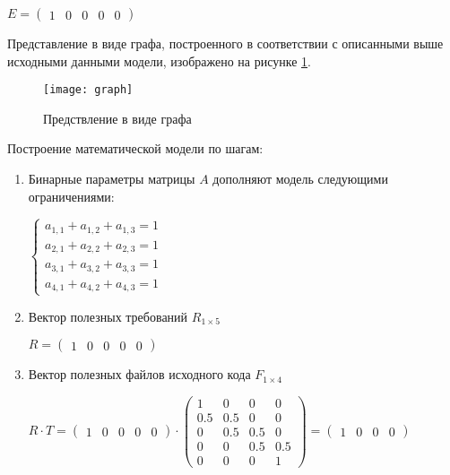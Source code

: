 \begin{center}
  $
  E = \begin{pmatrix}
    1 & 0 & 0 & 0 & 0
  \end{pmatrix}
  $
\end{center}

Представление в виде графа, построенного в соответствии с описанными выше исходными данными модели, изображено на рисунке \ref{fig:graph}.

\begin{figure}[H]
  \centering
  \texttt{[image: graph]}
  \caption{Предствление в виде графа}
  \label{fig:graph}
\end{figure}

Построение математической модели по шагам:
\begin{enumerate}
  \item Бинарные параметры матрицы $A$ дополняют модель следующими ограничениями:
  \begin{center}
    $
      \begin{cases}
        a_{1,1} + a_{1,2} + a_{1,3} = 1 \\ %
        a_{2,1} + a_{2,2} + a_{2,3} = 1 \\ %
        a_{3,1} + a_{3,2} + a_{3,3} = 1 \\ %
        a_{4,1} + a_{4,2} + a_{4,3} = 1 %
      \end{cases}
    $
  \end{center}

  \item Вектор полезных требований $R_{1 \times 5}$
  \begin{center}
    $
      R = 
      \begin{pmatrix}
        1 & 0 & 0 & 0 & 0
      \end{pmatrix}
    $
  \end{center}
  
  \item Вектор полезных файлов исходного кода $F_{1 \times 4}$
  \begin{center}
    $
      R \cdot T = 
      \begin{pmatrix}
        1 & 0 & 0 & 0 & 0
      \end{pmatrix}
      \cdot
      \begin{pmatrix}
        1 &   0 &   0 & 0   \\
      0.5 & 0.5 &   0 & 0   \\
        0 & 0.5 & 0.5 & 0   \\
        0 &   0 & 0.5 & 0.5 \\
        0 &   0 &   0 & 1 
    \end{pmatrix}
    = \begin{pmatrix}
        1 & 0 & 0 & 0
      \end{pmatrix}
    $
  \end{center}
  

\end{enumerate}
